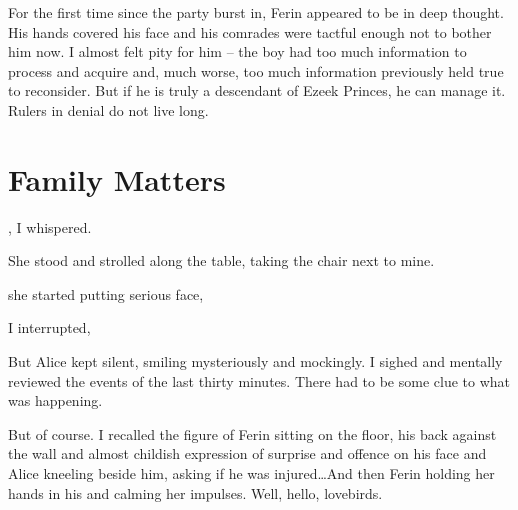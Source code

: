 For the first time since the party burst in, Ferin appeared to be in deep thought. His hands covered his face and his comrades were tactful enough not to bother him now. I almost felt pity for him -- the boy had too much information to process and acquire and, much worse, too much information previously held true to reconsider. But if he is truly a descendant of Ezeek Princes, he can manage it. Rulers in denial do not live long.

\section{Family Matters}

, I whispered. 

She stood and strolled along the table, taking the chair next to mine.



 she started putting serious face, 

 I interrupted, 

But Alice kept silent, smiling mysteriously and mockingly. I sighed and mentally reviewed the events of the last thirty minutes. There had to be some clue to what was happening.

But of course. I recalled the figure of Ferin sitting on the floor, his back against the wall and almost childish expression of surprise and offence on his face and Alice kneeling beside him, asking if he was injured\dots And then Ferin holding her hands in his and calming her impulses. Well, hello, lovebirds.

